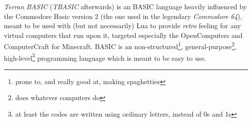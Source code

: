 \emph{Terran BASIC} (\emph{TBASIC} afterwards) is an BASIC language heavily influenced by the Commodore Basic version 2 (the one used in the legendary \emph{Commodore 64}), meant to be used with (but not necessarily) Lua to provide \emph{retro} feeling for any virtual computers that run upon it, targeted especially the OpenComputers and ComputerCraft for Minecraft. BASIC is an non-structured\footnote{prone to, and really good at, making spaghetties}, general-purpose\footnote{does whatever computers do}, high-level\footnote{at least the codes are written using ordinary letters, instead of 0s and 1s} programming language which is meant to be easy to use.
